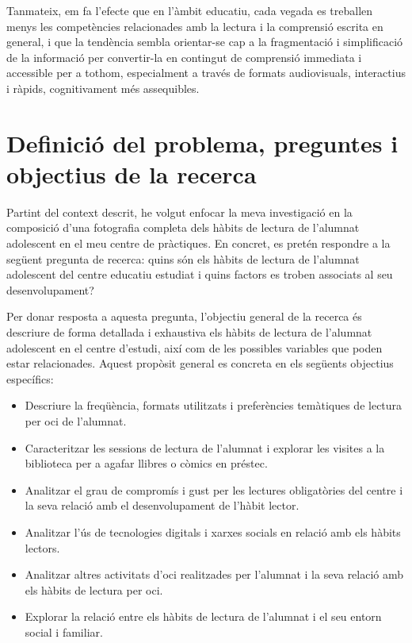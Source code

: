 \documentclass[12pt]{article}
\begin{document}
Tanmateix, em fa l'efecte que en l'àmbit educatiu, cada vegada es treballen menys les competències relacionades amb la lectura i la comprensió escrita en general, i que la tendència sembla orientar-se cap a la fragmentació i simplificació de la informació per convertir-la en contingut de comprensió immediata i accessible per a tothom, especialment a través de formats audiovisuals, interactius i ràpids, cognitivament més assequibles.

\newpage
\section{Definició del problema, preguntes i objectius de la recerca}
Partint del context descrit, he volgut enfocar la meva investigació en la composició d'una fotografia completa dels hàbits de lectura de l'alumnat adolescent en el meu centre de pràctiques. En concret, es pretén respondre a la següent pregunta de recerca: quins són els hàbits de lectura de l’alumnat adolescent del centre educatiu estudiat i quins factors es troben associats al seu desenvolupament?

Per donar resposta a aquesta pregunta, l’objectiu general de la recerca és descriure de forma detallada i exhaustiva els hàbits de lectura de l’alumnat adolescent en el centre d'estudi, així com de les possibles variables que poden estar relacionades. Aquest propòsit general es concreta en els següents objectius específics:

\begin{itemize}
    \item Descriure la freqüència, formats utilitzats i preferències temàtiques de lectura per oci de l’alumnat.
    \item Caracteritzar les sessions de lectura de l'alumnat i explorar les visites a la biblioteca per a agafar llibres o còmics en préstec.
    \item Analitzar el grau de compromís i gust per les lectures obligatòries del centre i la seva relació amb el desenvolupament de l’hàbit lector.
    \item Analitzar l’ús de tecnologies digitals i xarxes socials en relació amb els hàbits lectors.
    \item Analitzar altres activitats d'oci realitzades per l'alumnat i la seva relació amb els hàbits de lectura per oci.
    \item Explorar la relació entre els hàbits de lectura de l’alumnat i el seu entorn social i familiar.
\end{itemize}
\end{document}
